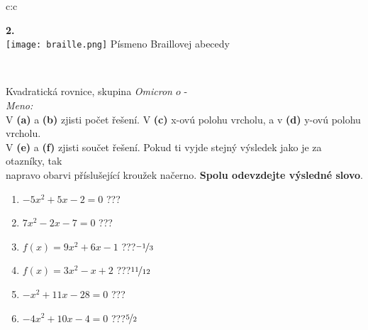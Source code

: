 \documentclass[10pt]{report}
\newcommand\omicron{o}
\begin{document}
\begin{tabular}{c:c}
\begin{minipage}[c][99mm][t]{0.49\linewidth}
\begin{center}
\begin{minipage}{0.20\linewidth}
\begin{center}
{\Huge\bfseries 2.} \\[2mm]
\texttt{[image: braille.png]}
{\small Písmeno Braillovej abecedy}
\end{center}
\end{minipage}
\end{center}
\end{minipage}
\\ \hdashline
\begin{minipage}[c][99mm][t]{0.49\linewidth}
\begin{center}
\vspace{7mm}
{\huge Kvadratická rovnice, skupina \textit{Omicron $\omicron$} -}\\[4.5mm]
\textit{Meno:}\phantom{xxxxxxxxxxxxxxxxxxxxxxxxxxxxxxxxxxxxxxxxxxxxxxxxxxxxxxxxxxxxxxxxx}\\[3.5mm]
V \textbf{(a)} a \textbf{(b)} zjisti počet řešení. V \textbf{(c)} x-ovú polohu vrcholu, a v \textbf{(d)} y-ovú polohu vrcholu.\\V \textbf{(e)} a \textbf{(f)} zjisti součet řešení. Pokud ti vyjde stejný výsledek jako je za otazníky, tak\\napravo obarvi příslušející kroužek načerno. \textbf{Spolu odevzdejte výsledné slovo}.\\[3mm]
\begin{minipage}{0.77\linewidth}
\begin{center}
\begin{varwidth}{\textwidth}
\begin{enumerate}
\large
\item $-5x^2+5x-2=0$\quad \dotfill\; ???\;\dotfill {}
\item $7x^2-2x-7=0$\quad \dotfill\; ???\;\dotfill {}
\item $f(x)=9x^2+6x-1$\quad \dotfill\; ???\;\dotfill \quad $\nicefrac{-1}{3}$
\item $f(x)=3x^2-x+2$\quad \dotfill\; ???\;\dotfill \quad $\nicefrac{11}{12}$
\item $-x^2+11x-28=0$\quad \dotfill\; ???\;\dotfill {}
\item $-4x^2+10x-4=0$\quad \dotfill\; ???\;\dotfill \quad $\nicefrac{5}{2}$
\end{enumerate}
\end{varwidth}
\end{center}
\end{minipage}
\begin{minipage}{0.20\linewidth}
\begin{center}

\end{center}
\end{minipage}
\end{center}
\end{minipage}
\end{tabular}
\end{document}
